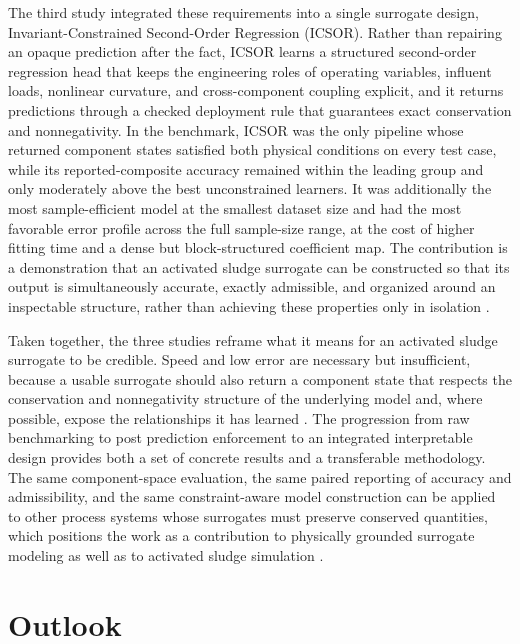\documentclass[12pt, twoside]{book}
\begin{document}
The third study integrated these requirements into a single surrogate design, Invariant-Constrained
Second-Order Regression (ICSOR). Rather than repairing an opaque prediction after the fact, ICSOR learns a
structured second-order regression head that keeps the engineering roles of operating variables, influent
loads, nonlinear curvature, and cross-component coupling explicit, and it returns predictions through a checked
deployment rule that guarantees exact conservation and nonnegativity. In the benchmark, ICSOR was the only
pipeline whose returned component states satisfied both physical conditions on every test case, while its
reported-composite accuracy remained within the leading group and only moderately above the best unconstrained
learners. It was additionally the most sample-efficient model at the smallest dataset size and had the most
favorable error profile across the full sample-size range, at the cost of higher fitting time and a dense but
block-structured coefficient map. The contribution is a demonstration that an activated sludge surrogate can be
constructed so that its output is simultaneously accurate, exactly admissible, and organized around an
inspectable structure, rather than achieving these properties only in isolation \citep{Rudin2019}.

Taken together, the three studies reframe what it means for an activated sludge surrogate to be credible. Speed
and low error are necessary but insufficient, because a usable surrogate should also return a component state
that respects the conservation and nonnegativity structure of the underlying model and, where possible, expose
the relationships it has learned \citep{Rudin2019,Shen2023}. The progression from raw benchmarking to post
prediction enforcement to an integrated interpretable design provides both a set of concrete results and a
transferable methodology. The same component-space evaluation, the same paired reporting of accuracy and
admissibility, and the same constraint-aware model construction can be applied to other process systems whose
surrogates must preserve conserved quantities, which positions the work as a contribution to physically
grounded surrogate modeling as well as to activated sludge simulation \citep{Karniadakis2021,Valente2025}.

\section*{Outlook}
\end{document}
